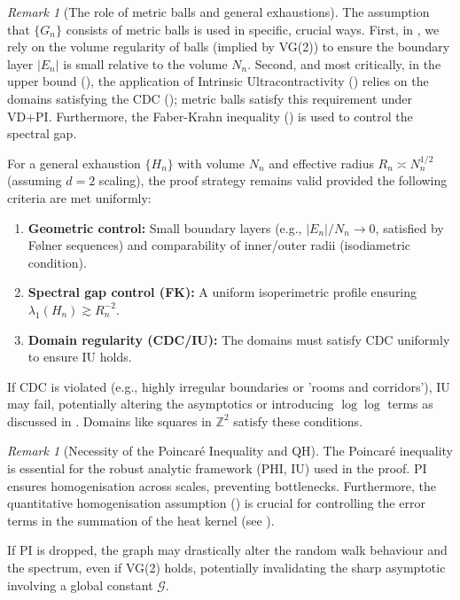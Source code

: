 \documentclass{article}
\numberwithin{equation}{section}
\theoremstyle{definition}
\theoremstyle{remark}
\newtheorem{remark}[theorem]{Remark}
\newcommand{\cG}{\mathcal{G}}
\begin{document}
\begin{remark}[The role of metric balls and general exhaustions]\label{rem:general_exhaustions}
The assumption that $\{G_n\}$ consists of metric balls is used in specific, crucial ways. First, in , we rely on the volume regularity of balls (implied by VG(2)) to ensure the boundary layer $|E_n|$ is small relative to the volume $N_n$. Second, and most critically, in the upper bound (), the application of Intrinsic Ultracontractivity () relies on the domains satisfying the CDC (); metric balls satisfy this requirement under VD+PI. Furthermore, the Faber-Krahn inequality () is used to control the spectral gap.

For a general exhaustion $\{H_n\}$ with volume $N_n$ and effective radius $R_n \asymp N_n^{1/2}$ (assuming $d=2$ scaling), the proof strategy remains valid provided the following criteria are met uniformly:
\begin{enumerate}
    \item \textbf{Geometric control:} Small boundary layers (e.g., $|E_n|/N_n \to 0$, satisfied by Følner sequences) and comparability of inner/outer radii (isodiametric condition).
    \item \textbf{Spectral gap control (FK):} A uniform isoperimetric profile ensuring $\lambda_1(H_n) \gtrsim R_n^{-2}$.
    \item \textbf{Domain regularity (CDC/IU):} The domains must satisfy CDC uniformly to ensure IU holds.
\end{enumerate}
If CDC is violated (e.g., highly irregular boundaries or 'rooms and corridors'), IU may fail, potentially altering the asymptotics or introducing $\log\log$ terms as discussed in . Domains like squares in $\mathbb{Z}^2$ satisfy these conditions.
\end{remark}

\begin{remark}[Necessity of the Poincaré Inequality and QH]
The Poincaré inequality is essential for the robust analytic framework (PHI, IU) used in the proof. PI ensures homogenisation across scales, preventing bottlenecks. Furthermore, the quantitative homogenisation assumption () is crucial for controlling the error terms in the summation of the heat kernel (see ).

If PI is dropped, the graph may drastically alter the random walk behaviour and the spectrum, even if VG(2) holds, potentially invalidating the sharp asymptotic involving a global constant $\cG$.
\end{remark}
\end{document}
